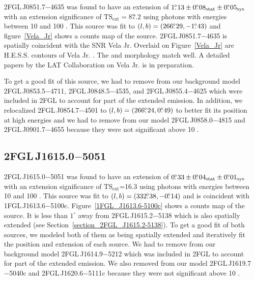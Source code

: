\documentclass[12pt,preprint]{aastex}
\newcommand{\gev}{\text{GeV}\xspace}
\newcommand{\tev}{\text{TeV}\xspace}
\newcommand{\tsext}{{\ensuremath{\text{TS}_{\text{ext}}}}\xspace}
\newcommand{\sys}{\text{sys}\xspace}
\newcommand{\stat}{\text{stat}\xspace}
\newcommand{\degree}{^\circ\xspace}
\begin{document}
2FGL\,J0851.7$-$4635 was found 
to have an
extension of $1\fdg13\pm0\fdg08_\stat\pm0\fdg05_\sys$ 
with an extension
significance of $\tsext=87.2$
using photons with energies between 10 \gev and 100 \gev.  
This source was fit to 
$(l,b)=(266\mbox{$.\!\!^\circ$}29,-1\mbox{$.\!\!^\circ$}43)$ and figure~\ref{Vela_Jr} shows a counts
map of the source.
2FGL\,J0851.7$-$4635 is spatially coincident with the SNR Vela Jr.
Overlaid on Figure~\ref{Vela_Jr} are H.E.S.S. \tev contours of Vela Jr.
\citep{vela_jr_hess}.  The \gev and \tev morphology
match well.  A detailed papers by the LAT Collaboration on Vela Jr. is
in preparation.

To get a good fit of this source, we had to remove from
our background model 
2FGL\,J0853.5$-$4711, 2FGL\,J0848.5$-$4535, and 2FGL\,J0855.4$-$4625
which were included in 2FGL to account for part of the extended emission.  In addition, we relocalized
2FGL\,J0854.7$-$4501 to
$(l,b)=(266\mbox{$.\!\!^\circ$}24,0\mbox{$.\!\!^\circ$}49)$ to better fit its position at high energies
and we had to remove from our model 2FGL\,J0858.0$-$4815 and 2FGL\,J0901.7$-$4655
because they were not significant above 10 \gev.  

\subsection{2FGL\,J1615.0$-$5051}
\label{section_2FGL_J1615.0-5051}


2FGL\,J1615.0$-$5051 was found 
to have an extension of $0\fdg33\pm0\fdg04_\stat\pm0\fdg01_\sys$
with an extension significance of \tsext=16.3
using 
photons with energies between
10 \gev and 100 \gev.  This source
was fit to $(l,b)=(332\mbox{$.\!\!^\circ$}38,-0\mbox{$.\!\!^\circ$}14)$ and
is coincident with 
1FGL\,J1613.6$-$5100c. Figure~\ref{1FGL_J1613.6-5100c} shows a counts map
of the source.
It is less than $1\degree$ away from 2FGL\,J1615.2$-$5138 which is
also spatially extended (see Section~\ref{section_2FGL_J1615.2-5138}).
To get a good fit of both sources, we modeled both of them as
being spatially extended and iteratively fit the position and extension
of each source. 
We had to remove from our background model 2FGL\,J1614.9$-$5212 
which was included in 2FGL to account for part of the extended emission.
We also removed from our model 2FGL\,J1619.7$-$5040c and 2FGL\,J1620.6$-$5111c because they were not
significant above 10 \gev.  
\end{document}
